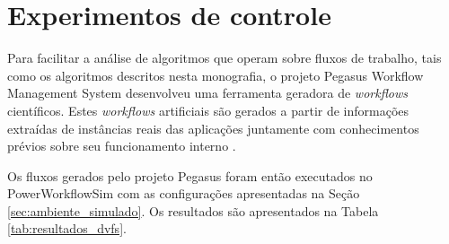 \section{Experimentos de controle}
\label{sec:experimentos-controle}
Para facilitar a análise de algoritmos que operam sobre fluxos de trabalho,
tais como os algoritmos descritos nesta monografia, o projeto Pegasus Workflow
Management System desenvolveu uma ferramenta geradora de \emph{workflows}
científicos. Estes \emph{workflows} artificiais são gerados a partir de
informações extraídas de instâncias reais das aplicações juntamente com
conhecimentos prévios sobre seu funcionamento interno
\cite{pegasus:workflowgenerator}.

Os fluxos gerados pelo projeto Pegasus foram então executados no
PowerWorkflowSim com as configurações apresentadas na Seção 
\ref{sec:ambiente_simulado}. Os resultados são apresentados na Tabela 
\ref{tab:resultados_dvfs}.

